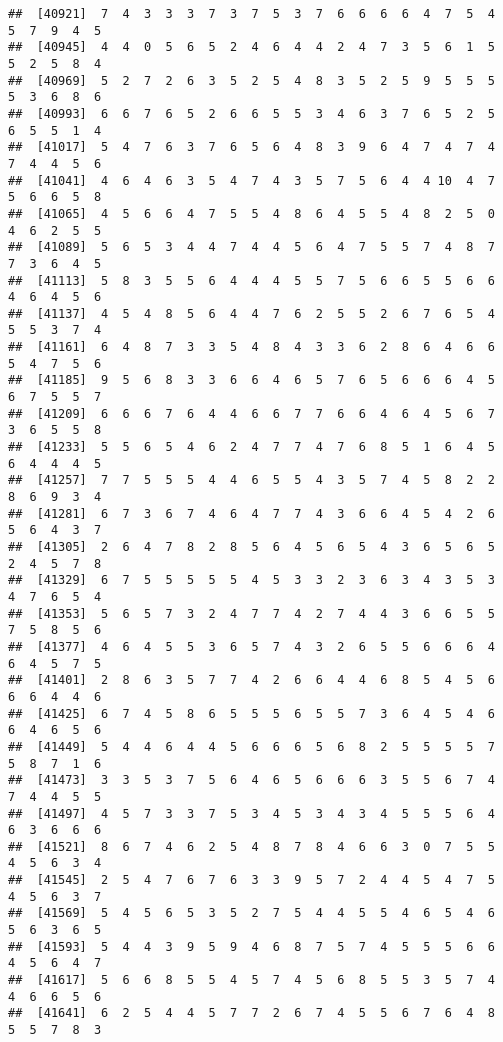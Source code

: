 \documentclass[
]{book}
\begin{document}
\begin{verbatim}
##  [40921]  7  4  3  3  3  7  3  7  5  3  7  6  6  6  6  4  7  5  4  5  7  9  4  5
##  [40945]  4  4  0  5  6  5  2  4  6  4  4  2  4  7  3  5  6  1  5  5  2  5  8  4
##  [40969]  5  2  7  2  6  3  5  2  5  4  8  3  5  2  5  9  5  5  5  5  3  6  8  6
##  [40993]  6  6  7  6  5  2  6  6  5  5  3  4  6  3  7  6  5  2  5  6  5  5  1  4
##  [41017]  5  4  7  6  3  7  6  5  6  4  8  3  9  6  4  7  4  7  4  7  4  4  5  6
##  [41041]  4  6  4  6  3  5  4  7  4  3  5  7  5  6  4  4 10  4  7  5  6  6  5  8
##  [41065]  4  5  6  6  4  7  5  5  4  8  6  4  5  5  4  8  2  5  0  4  6  2  5  5
##  [41089]  5  6  5  3  4  4  7  4  4  5  6  4  7  5  5  7  4  8  7  7  3  6  4  5
##  [41113]  5  8  3  5  5  6  4  4  4  5  5  7  5  6  6  5  5  6  6  4  6  4  5  6
##  [41137]  4  5  4  8  5  6  4  4  7  6  2  5  5  2  6  7  6  5  4  5  5  3  7  4
##  [41161]  6  4  8  7  3  3  5  4  8  4  3  3  6  2  8  6  4  6  6  5  4  7  5  6
##  [41185]  9  5  6  8  3  3  6  6  4  6  5  7  6  5  6  6  6  4  5  6  7  5  5  7
##  [41209]  6  6  6  7  6  4  4  6  6  7  7  6  6  4  6  4  5  6  7  3  6  5  5  8
##  [41233]  5  5  6  5  4  6  2  4  7  7  4  7  6  8  5  1  6  4  5  6  4  4  4  5
##  [41257]  7  7  5  5  5  4  4  6  5  5  4  3  5  7  4  5  8  2  2  8  6  9  3  4
##  [41281]  6  7  3  6  7  4  6  4  7  7  4  3  6  6  4  5  4  2  6  5  6  4  3  7
##  [41305]  2  6  4  7  8  2  8  5  6  4  5  6  5  4  3  6  5  6  5  2  4  5  7  8
##  [41329]  6  7  5  5  5  5  5  4  5  3  3  2  3  6  3  4  3  5  3  4  7  6  5  4
##  [41353]  5  6  5  7  3  2  4  7  7  4  2  7  4  4  3  6  6  5  5  7  5  8  5  6
##  [41377]  4  6  4  5  5  3  6  5  7  4  3  2  6  5  5  6  6  6  4  6  4  5  7  5
##  [41401]  2  8  6  3  5  7  7  4  2  6  6  4  4  6  8  5  4  5  6  6  6  4  4  6
##  [41425]  6  7  4  5  8  6  5  5  5  6  5  5  7  3  6  4  5  4  6  6  4  6  5  6
##  [41449]  5  4  4  6  4  4  5  6  6  6  5  6  8  2  5  5  5  5  7  5  8  7  1  6
##  [41473]  3  3  5  3  7  5  6  4  6  5  6  6  6  3  5  5  6  7  4  7  4  4  5  5
##  [41497]  4  5  7  3  3  7  5  3  4  5  3  4  3  4  5  5  5  6  4  6  3  6  6  6
##  [41521]  8  6  7  4  6  2  5  4  8  7  8  4  6  6  3  0  7  5  5  4  5  6  3  4
##  [41545]  2  5  4  7  6  7  6  3  3  9  5  7  2  4  4  5  4  7  5  4  5  6  3  7
##  [41569]  5  4  5  6  5  3  5  2  7  5  4  4  5  5  4  6  5  4  6  5  6  3  6  5
##  [41593]  5  4  4  3  9  5  9  4  6  8  7  5  7  4  5  5  5  6  6  4  5  6  4  7
##  [41617]  5  6  6  8  5  5  4  5  7  4  5  6  8  5  5  3  5  7  4  4  6  6  5  6
##  [41641]  6  2  5  4  4  5  7  7  2  6  7  4  5  5  6  7  6  4  8  5  5  7  8  3

\end{verbatim}
\end{document}
